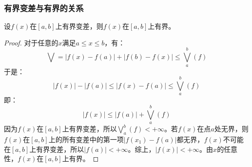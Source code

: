 \subsubsection{有界变差与有界的关系}
\begin{theorem}
	设$f(x)$在$[a,b]$上有界变差，则$f(x)$在$[a,b]$上有界。
\end{theorem}
\begin{proof}
	对于任意的$x$满足$a\leqslant x\leqslant b$，有：
	\begin{equation*}
		\bigvee=|f(x)-f(a)|+|f(b)-f(x)|\leqslant\bigvee_{a}^{b}(f)
	\end{equation*}
	于是：
	\begin{equation*}
		|f(x)|-|f(a)|\leqslant|f(x)-f(a)|\leqslant\bigvee_{a}^{b}(f)
	\end{equation*}
	即：
	\begin{equation*}
		|f(x)|\leqslant|f(a)|+\bigvee_{a}^{b}(f)
	\end{equation*}
	因为$f(x)$在$[a,b]$上有界变差，所以$\bigvee_{a}^{b}(f)<+\infty$。若$f(x)$在点$a$处无界，则$f(x)$在$[a,b]$上的所有变差中的第一项$|f(x_1)-f(a)|$都无界，$f(x)$不可能在$[a,b]$上有界变差，所以$|f(a)|<+\infty$。综上，$|f(x)|<+\infty$。由$x$的任意性，$f(x)$在$[a,b]$上有界。
\end{proof}
